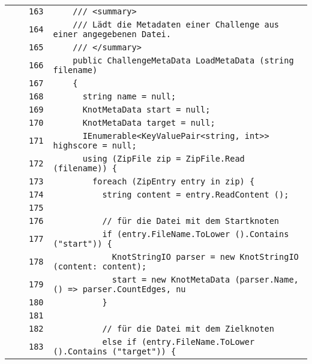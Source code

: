 \documentclass[a4paper,10pt]{article}
\begin{document}
\begin{longtable}[l]{lrrl}
\cellcolor{gray} &  & \verb~163~ & \verb~    /// <summary>~\\
\cellcolor{gray} &  & \verb~164~ & \verb~    /// Lädt die Metadaten einer Challenge aus einer angegebenen Datei.~\\
\cellcolor{gray} &  & \verb~165~ & \verb~    /// </summary>~\\
\cellcolor{gray} &  & \verb~166~ & \verb~    public ChallengeMetaData LoadMetaData (string filename)~\\
\cellcolor{gray} &  & \verb~167~ & \verb~    {~\\
\cellcolor{gray} &  & \verb~168~ & \verb~      string name = null;~\\
\cellcolor{gray} &  & \verb~169~ & \verb~      KnotMetaData start = null;~\\
\cellcolor{gray} &  & \verb~170~ & \verb~      KnotMetaData target = null;~\\
\cellcolor{gray} &  & \verb~171~ & \verb~      IEnumerable<KeyValuePair<string, int>> highscore = null;~\\
\cellcolor{gray} &  & \verb~172~ & \verb~      using (ZipFile zip = ZipFile.Read (filename)) {~\\
\cellcolor{gray} &  & \verb~173~ & \verb~        foreach (ZipEntry entry in zip) {~\\
\cellcolor{gray} &  & \verb~174~ & \verb~          string content = entry.ReadContent ();~\\
\cellcolor{gray} &  & \verb~175~ & \verb~~\\
\cellcolor{gray} &  & \verb~176~ & \verb~          // für die Datei mit dem Startknoten~\\
\cellcolor{gray} &  & \verb~177~ & \verb~          if (entry.FileName.ToLower ().Contains ("start")) {~\\
\cellcolor{gray} &  & \verb~178~ & \verb~            KnotStringIO parser = new KnotStringIO (content: content);~\\
\cellcolor{gray} &  & \verb~179~ & \verb~            start = new KnotMetaData (parser.Name, () => parser.CountEdges, nu~\\
\cellcolor{gray} &  & \verb~180~ & \verb~          }~\\
\cellcolor{gray} &  & \verb~181~ & \verb~~\\
\cellcolor{gray} &  & \verb~182~ & \verb~          // für die Datei mit dem Zielknoten~\\
\cellcolor{gray} &  & \verb~183~ & \verb~          else if (entry.FileName.ToLower ().Contains ("target")) {~\\

\end{longtable}
\end{document}

